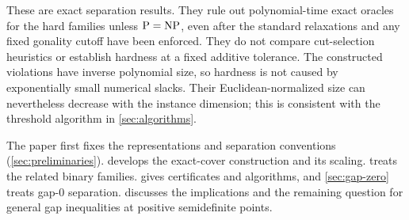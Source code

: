 These are exact separation results.  They rule out polynomial-time
exact oracles for the hard families unless $\mathrm P=\mathrm{NP}$, even after
the standard relaxations and any fixed gonality cutoff have been
enforced.  They do not compare cut-selection heuristics or establish
hardness at a fixed additive tolerance.  The constructed violations have inverse
polynomial size, so hardness is not caused by exponentially small
numerical slacks.  Their Euclidean-normalized size can nevertheless
decrease with the instance dimension; this is consistent with the
threshold algorithm in \cref{sec:algorithms}.

The paper first fixes the representations and separation conventions
(\cref{sec:preliminaries}).   develops the exact-cover
construction and its scaling.   treats the related
binary families.   gives certificates and
algorithms, and \cref{sec:gap-zero} treats gap-$0$ separation.
 discusses the implications and the remaining
question for general gap inequalities at positive semidefinite
points.
